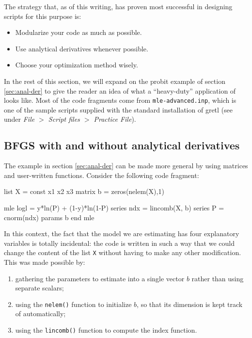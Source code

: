 The strategy that, as of this writing, has proven most successful in
designing scripts for this purpose is:
\begin{itemize}
\item Modularize your code as much as possible.
\item Use analytical derivatives whenever possible.
\item Choose your optimization method wisely.
\end{itemize}

In the rest of this section, we will expand on the probit example of
section \ref{sec:anal-der} to give the reader an idea of what a
``heavy-duty'' application of  looks like. Most of the code
fragments come from \verb|mle-advanced.inp|, which is one of the
sample scripts supplied with the standard installation of gretl
(see under \emph{File $>$ Script files $>$ Practice File}).

\subsection{BFGS with and without analytical derivatives}
\label{sec:mle-adv-bfgs}

The example in section \ref{sec:anal-der} can be made more general by
using matrices and user-written functions. Consider the following code
fragment:
\begin{code}
list X = const x1 x2 x3
matrix b = zeros(nelem(X),1)

mle logl = y*ln(P) + (1-y)*ln(1-P)
    series ndx = lincomb(X, b)
    series P = cnorm(ndx)
    params b
end mle
\end{code}

In this context, the fact that the model we are estimating has four
explanatory variables is totally incidental: the code is written in
such a way that we could change the content of the list \texttt{X}
without having to make any other modification. This was made possible
by:
\begin{enumerate}
\item gathering the parameters to estimate into a single vector $b$
  rather than using separate scalars;
\item using the \texttt{nelem()} function to initialize $b$, so that
  its dimension is kept track of automatically;
\item using the \texttt{lincomb()} function to compute the index
  function.
\end{enumerate}

